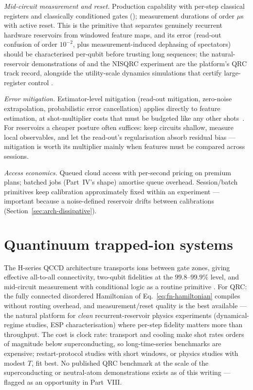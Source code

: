 \emph{Mid-circuit measurement and reset.} Production capability with
per-step classical registers and classically conditioned gates
(); measurement durations of order $\mu$s with
active reset. This is the primitive that separates genuinely recurrent
hardware reservoirs from windowed feature maps, and its error (read-out
confusion of order $10^{-2}$, plus measurement-induced dephasing of
spectators) should be characterised per-qubit before trusting long
sequences; the natural-reservoir demonstrations of
\citet{suzuki2022natural,yasuda2023quantum} and the NISQRC experiment
\citep{hu2024overcoming} are the platform's QRC track record, alongside the
utility-scale dynamics simulations that certify large-register control
\citep{kim2023evidence}.

\emph{Error mitigation.} Estimator-level mitigation (read-out
mitigation, zero-noise extrapolation, probabilistic error cancellation)
applies directly to feature estimation, at shot-multiplier costs that must be
budgeted like any other shots~\citep{larose2022mitiq}. For reservoirs a
cheaper posture often suffices: keep circuits shallow, measure local
observables, and let the read-out's regularisation absorb residual bias ---
mitigation is worth its multiplier mainly when features must be compared
across sessions.

\emph{Access economics.} Queued cloud access with per-second pricing on
premium plans; batched jobs (Part~IV's shape) amortise queue overhead.
Session/batch primitives keep calibration approximately fixed within an
experiment --- important because a noise-defined reservoir drifts between
calibrations (Section~\ref{sec:arch-dissipative}).

\section{Quantinuum trapped-ion systems}
\label{sec:hw-quantinuum}

The H-series QCCD architecture transports ions between gate zones, giving
effective all-to-all connectivity, two-qubit fidelities at the
$99.8$--$99.9\%$ level, and mid-circuit measurement with conditional logic as
a routine primitive \citep{moses2023race}. For QRC: the fully connected
disordered Hamiltonian of Eq.~\eqref{eq:fn-hamiltonian} compiles without
routing overhead, and measurement/reset quality is the best available ---
the natural platform for \emph{clean} recurrent-reservoir physics
experiments (dynamical-regime studies, ESP characterisation) where per-step
fidelity matters more than throughput. The cost is clock rate: transport and
cooling make shot rates orders of magnitude below superconducting, so
long-time-series benchmarks are expensive; restart-protocol studies with
short windows, or physics studies with modest $T$, fit best. No published
QRC benchmark at the scale of the superconducting or neutral-atom
demonstrations exists as of this writing --- flagged as an opportunity in
Part~VIII.

